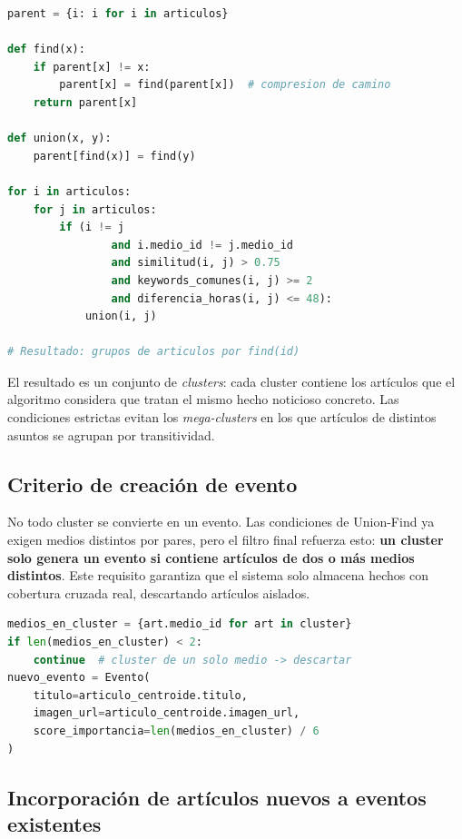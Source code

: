 \documentclass[12pt,a4paper]{article}
\begin{document}
\begin{lstlisting}[language=Python, caption=Pseudocódigo simplificado de Union-Find para eventos]
parent = {i: i for i in articulos}

def find(x):
    if parent[x] != x:
        parent[x] = find(parent[x])  # compresion de camino
    return parent[x]

def union(x, y):
    parent[find(x)] = find(y)

for i in articulos:
    for j in articulos:
        if (i != j
                and i.medio_id != j.medio_id
                and similitud(i, j) > 0.75
                and keywords_comunes(i, j) >= 2
                and diferencia_horas(i, j) <= 48):
            union(i, j)

# Resultado: grupos de articulos por find(id)
\end{lstlisting}

El resultado es un conjunto de \textit{clusters}: cada cluster contiene los artículos que el algoritmo considera que tratan el mismo hecho noticioso concreto. Las condiciones estrictas evitan los \textit{mega-clusters} en los que artículos de distintos asuntos se agrupan por transitividad.

\subsection{Criterio de creación de evento}

No todo cluster se convierte en un evento. Las condiciones de Union-Find ya exigen medios distintos por pares, pero el filtro final refuerza esto: \textbf{un cluster solo genera un evento si contiene artículos de dos o más medios distintos}. Este requisito garantiza que el sistema solo almacena hechos con cobertura cruzada real, descartando artículos aislados.

\begin{lstlisting}[language=Python, caption=Filtro de cobertura cruzada en embeddings.py]
medios_en_cluster = {art.medio_id for art in cluster}
if len(medios_en_cluster) < 2:
    continue  # cluster de un solo medio -> descartar
nuevo_evento = Evento(
    titulo=articulo_centroide.titulo,
    imagen_url=articulo_centroide.imagen_url,
    score_importancia=len(medios_en_cluster) / 6
)
\end{lstlisting}

\subsection{Incorporación de artículos nuevos a eventos existentes}
\end{document}
